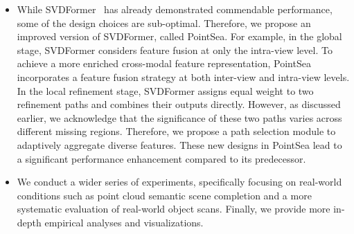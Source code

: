 \begin{itemize}
  \item While SVDFormer~\citep{Zhu_2023_ICCV} has already demonstrated commendable performance, some of the design choices are sub-optimal. Therefore, we propose an improved version of SVDFormer, called PointSea. For example, in the global stage, SVDFormer considers feature fusion at only the intra-view level. To achieve a more enriched cross-modal feature representation, PointSea incorporates a feature fusion strategy at both inter-view and intra-view levels. In the local refinement stage, SVDFormer assigns equal weight to two refinement paths and combines their outputs directly. However, as discussed earlier, we acknowledge that the significance of these two paths varies across different missing regions. Therefore, we propose a path selection module to adaptively aggregate diverse features. These new designs in PointSea lead to a significant performance enhancement compared to its predecessor.

 \item We conduct a wider series of experiments, specifically focusing on real-world conditions such as point cloud semantic scene completion and a more systematic evaluation of real-world object scans. Finally, we provide more in-depth empirical analyses and visualizations.
\end{itemize}